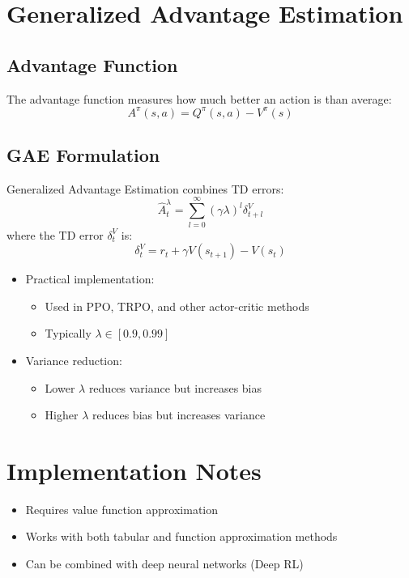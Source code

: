 \documentclass{article}
\begin{document}
\section{Generalized Advantage Estimation}

\subsection{Advantage Function}
The advantage function measures how much better an action is than average:
\begin{equation}
    A^\pi(s,a) = Q^\pi(s,a) - V^\pi(s)
\end{equation}

\subsection{GAE Formulation}
Generalized Advantage Estimation combines TD errors:
\begin{equation}
    \hat{A}_t^\lambda = \sum_{l=0}^\infty (\gamma \lambda)^l \delta_{t+l}^V
\end{equation}
where the TD error $\delta_t^V$ is:
\begin{equation}
    \delta_t^V = r_t + \gamma V(s_{t+1}) - V(s_t)
\end{equation}

\begin{itemize}
    \item Practical implementation:
        \begin{itemize}
            \item Used in PPO, TRPO, and other actor-critic methods
            \item Typically $\lambda \in [0.9, 0.99]$
        \end{itemize}
    \item Variance reduction:
        \begin{itemize}
            \item Lower $\lambda$ reduces variance but increases bias
            \item Higher $\lambda$ reduces bias but increases variance
        \end{itemize}
\end{itemize}

\section*{Implementation Notes}
\begin{itemize}
    \item Requires value function approximation
    \item Works with both tabular and function approximation methods
    \item Can be combined with deep neural networks (Deep RL)
\end{itemize}
\end{document}
